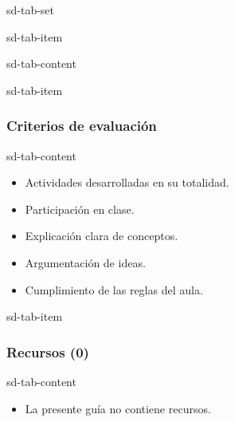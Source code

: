 \documentclass[letterpaper,10pt,spanish]{sphinxmanual}
\begin{document}
\begin{sphinxuseclass}{sd-tab-set}
\begin{sphinxuseclass}{sd-tab-item}
\begin{sphinxuseclass}{sd-tab-content}
\begin{itemize}
\end{itemize}

\end{sphinxuseclass}
\end{sphinxuseclass}
\begin{sphinxuseclass}{sd-tab-item}\subsubsection*{Criterios de evaluación}

\begin{sphinxuseclass}{sd-tab-content}\begin{itemize}
\item {} 
\sphinxAtStartPar
Actividades desarrolladas en su totalidad.

\item {} 
\sphinxAtStartPar
Participación en clase.

\item {} 
\sphinxAtStartPar
Explicación clara de conceptos.

\item {} 
\sphinxAtStartPar
Argumentación de ideas.

\item {} 
\sphinxAtStartPar
Cumplimiento de las reglas del aula.

\end{itemize}

\end{sphinxuseclass}
\end{sphinxuseclass}
\begin{sphinxuseclass}{sd-tab-item}\subsubsection*{Recursos (0)}

\begin{sphinxuseclass}{sd-tab-content}\begin{itemize}
\item {} 
\sphinxAtStartPar
La presente guía no contiene recursos.

\end{itemize}

\end{sphinxuseclass}
\end{sphinxuseclass}
\end{sphinxuseclass}
\end{document}
